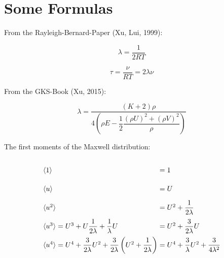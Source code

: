 \documentclass[
	pdftex,             %
	12pt,				%
	a4paper,		   	%
	english,				%
	oneside,			%
]{article}
\newcommand{\mom}[1]{\langle #1 \rangle}
\begin{document}
\clearpage

\section{Some Formulas}

From the Rayleigh-Bernard-Paper (Xu, Lui, 1999):

\begin{equation}
\lambda = \frac{1}{2RT}
\end{equation}

\begin{equation}
\tau = \frac{\nu}{RT} = 2\lambda\nu
\end{equation}

From the GKS-Book (Xu, 2015):

\begin{equation}
\lambda =\frac{(K+2)\rho}
{4\left( \rho E - \dfrac{1}{2} \dfrac{(\rho U)^2 + (\rho V)^2}{\rho}  \right)}
\end{equation}

The first moments of the Maxwell distribution:

\begin{equation}
\arraycolsep=1.4pt\def\arraystretch{2.2}
\begin{array}{lcl}
\mom{1} &=& 1 \\
\mom{u} &=& U \\
\mom{u^2} &=& U^2 + \dfrac{1}{2\lambda} \\
\mom{u^3} = U^3 + U\dfrac{1}{2\lambda} + \dfrac{1}{\lambda} U &=& U^2 + \dfrac{3}{2\lambda} U \\
\mom{u^4} = U^4 + \dfrac{3}{2\lambda} U^2 + \dfrac{3}{2\lambda} \left(U^2 + \dfrac{1}{2\lambda} \right)
		  &=& U^4 + \dfrac{3}{\lambda} U^2 + \dfrac{3}{4\lambda^2}
\end{array}
\end{equation}
\end{document}
